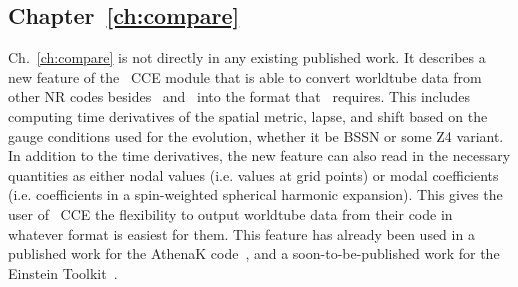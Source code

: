 \begin{bibunit}[unsrtnat]
\subsection{Chapter~\ref{ch:compare}}
Ch.~\ref{ch:compare} is not directly in any existing published work. It
describes a new feature of the \spectre~CCE module that is able to convert
worldtube data from other NR codes besides \spec~and \spectre~into the format
that \spectre~requires. This includes computing time derivatives of the spatial
metric, lapse, and shift based on the gauge conditions used for the evolution,
whether it be BSSN or some Z4 variant. In addition to the time derivatives, the
new feature can also read in the necessary quantities as either nodal values
(i.e. values at grid points) or modal coefficients (i.e. coefficients in a
spin-weighted spherical harmonic expansion). This gives the user of \spectre~CCE
the flexibility to output worldtube data from their code in whatever format is
easiest for them. This feature has already been used in a published work for the
AthenaK code~\cite{Radice:2025djo}, and a soon-to-be-published work for the
Einstein Toolkit~\cite{Loffler:2011ay,EinsteinToolkit:2025_05}.

\putbib[refs]
\end{bibunit}
